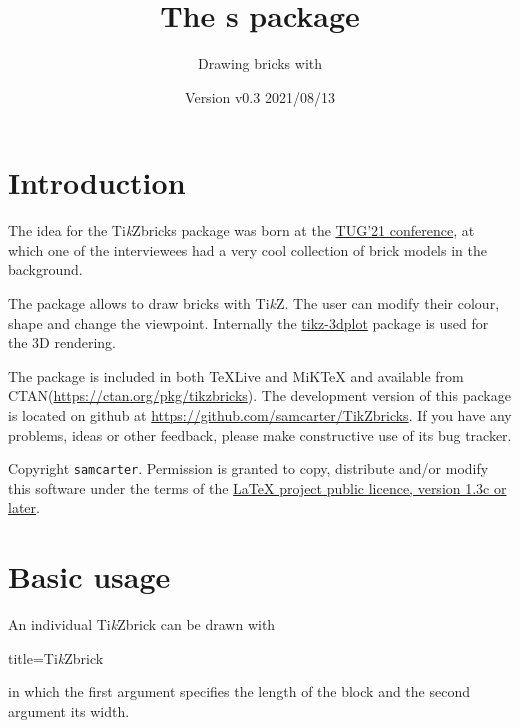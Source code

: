 \documentclass[parskip=half]{scrartcl}
\title{The \tikzbrick{}s package}
\subtitle{Drawing bricks with \TikZ}
\author{%
	\texorpdfstring{
		\begin{tikzpicture}
			 \brick[color=blue]{4}{2}
		\end{tikzpicture}\\[0.8em]		
		\texttt{samcarter}\\
		\url{https://github.com/samcarter/TikZbricks}\\
		\url{https://www.ctan.org/pkg/tikzbricks}
	}{samcarter}}
\date{Version v0.3 \textendash{} 2021/08/13}
\newcommand{\CTAN}{\textsc{CTAN}\xspace}
\newcommand{\TikZ}{Ti\emph{k}Z\xspace}
\newcommand{\miktex}{MiK\TeX\xspace}
\newcommand{\texlive}{\TeX{}Live\xspace}
\newcommand{\tikzbrick}{Ti\emph{k}Zbrick\xspace}
\begin{document}
\maketitle
\thispagestyle{scrheadings}

\section{Introduction}
\label{intro}

The idea for the \tikzbrick{}s package was born at the \href{https://tug.org/tug2021/}{TUG'21 conference}, at which one of the interviewees had a very cool collection of brick models in the background. %

The package allows to draw bricks with \TikZ. The user can modify their colour, shape and change the viewpoint. Internally the \href{https://ctan.org/pkg/tikz-3dplot}{tikz-3dplot} package is used for the 3D rendering. 

The package is included in both \texlive and \miktex and available from \CTAN (\url{https://ctan.org/pkg/tikzbricks}).  
The development version of this package is located on github at \url{https://github.com/samcarter/TikZbricks}. If you have any problems, ideas or other feedback, please make constructive use of its bug tracker.

Copyright  \texttt{samcarter}. Permission is granted to copy, distribute and\slash or modify this software under the terms of the \href{http://www.latex-project.org/lppl.txt}{LaTeX project public licence, version 1.3c or later}.

\section{Basic usage}

An individual \tikzbrick can be drawn with
\begin{tcblisting}{title={\tikzbrick}}
\end{tcblisting}
in which the first argument specifies the length of the block and the second argument its width. 
\end{document}
